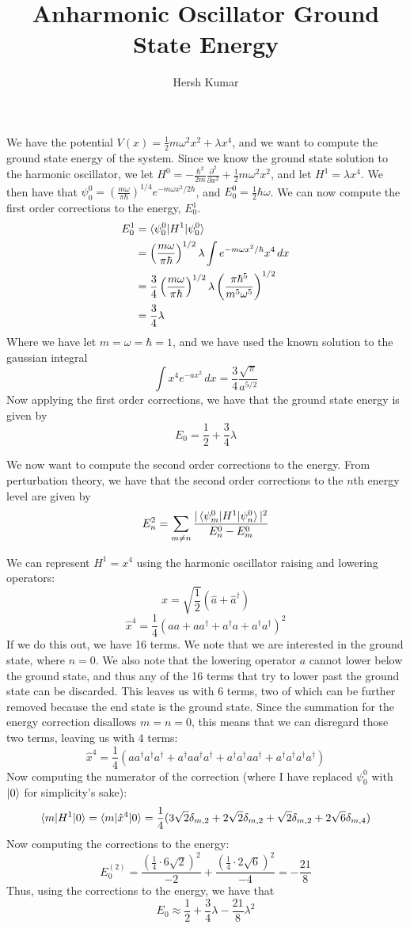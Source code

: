 \documentclass{notes}
\title{Anharmonic Oscillator Ground State Energy}
\author{Hersh Kumar}
\begin{document}
We have the potential $V(x) = \frac{1}{2}m\omega^2 x^2 + \lambda x^4$, and we want to compute the ground state energy of the system. Since we know the ground state solution to the harmonic oscillator, we let $H^0 = -\frac{\hbar^2}{2m}\frac{\partial ^2}{\partial x^2} + \frac{1}{2}m\omega^2 x^2$, and let $H^1 = \lambda x^4$. We then have that $\psi_0^0 = \left(\frac{m\omega}{\pi \hbar}\right)^{1/4} e^{-m\omega x^2/2\hbar}$, and $E_0^0 = \frac{1}{2}\hbar \omega$. We can now compute the first order corrections to the energy, $E_0^1$.
\begin{align*}
E_0^1 &= \braket{\psi_0^0 | H^1|\psi_0^0} \\ 
&= \left(\frac{m\omega}{\pi\hbar}\right)^{1/2}\lambda \int e^{-m\omega x^2/\hbar}x^4\,dx \\
&= \frac{3}{4}\left(\frac{m\omega}{\pi\hbar}\right)^{1/2}\lambda \left(\frac{\pi \hbar^5}{m^5\omega^5}\right)^{1/2}\\ 
&= \frac{3}{4}\lambda
\end{align*}
Where we have let $m = \omega = \hbar = 1$, and we have used the known solution to the gaussian integral
$$\int x^4 e^{-ax^2}\,dx = \frac{3}{4}\frac{\sqrt{\pi}}{a^{5/2}}$$
Now applying the first order corrections, we have that the ground state energy is given by
$$E_{0} = \frac{1}{2} + \frac{3}{4}\lambda$$


We now want to compute the second order corrections to the energy.
From perturbation theory, we have that the second order corrections to the $n$th energy level
are given by 
$$E_{n}^2 = \sum_{m\neq n} \frac{|\braket{\psi_m^0|H^1|\psi_n^0}|^2}{E_n^0 - E_m^0}$$

We can represent $H^1 = x^4$ using the harmonic oscillator raising and lowering operators:
$$\hat{x} = \sqrt{\frac{1}{2}}(\hat{a} + \hat{a}^\dagger)$$
$$\hat{x}^4 = \frac{1}{4}(aa + aa^\dagger + a^\dagger a + a^\dagger a^\dagger)^2$$
If we do this out, we have 16 terms. We note that we are interested in the ground state, where $n=0$. We also note that the lowering operator $a$ cannot lower below the ground state,
and thus any of the 16 terms that try to lower past the ground state can be discarded. This leaves us with 6 terms, two of which can be further removed because the end state is the ground state.
Since the summation for the energy correction disallows $m=n=0$, this means that we can disregard those two terms, leaving us with 4 terms:
$$\hat{x}^4 = \frac{1}{4}(a a^\dagger a^\dagger a^\dagger + a^\dagger a a^\dagger a^\dagger + a^\dagger a ^\dagger a a^\dagger + a^\dagger a^\dagger a^\dagger a^\dagger)$$
Now computing the numerator of the correction (where I have replaced $\psi_0^0$ with $\ket{0}$ for simplicity's sake):
$$\braket{m|H^1|0} = \braket{m|\hat{x}^4|0} = \frac{1}{4}(3\sqrt{2}\delta_{m,2} + 2\sqrt{2}\delta_{m,2} + \sqrt{2}\delta_{m,2} + 2\sqrt{6}\delta_{m,4})$$
Now computing the corrections to the energy:
$$E_0^{(2)} = \frac{\left(\frac{1}{4}\cdot 6\sqrt{2}\right)^2}{-2} + \frac{\left(\frac{1}{4}\cdot 2\sqrt{6}\right)^2}{-4} = -\frac{21}{8}$$
Thus, using the corrections to the energy, we have that 
$$E_0 \approx \frac{1}{2} + \frac{3}{4}\lambda - \frac{21}{8}\lambda^2$$
\end{document}

